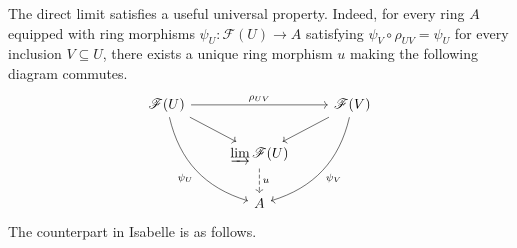 \documentclass[12pt]{scrartcl}
\begin{document}
The direct limit satisfies a useful universal property. Indeed, for every ring $A$ equipped with ring morphisms $\psi_U: \mathscr{F}(U) \rightarrow A$ satisfying $\psi_V \circ \rho_{UV} = \psi_U$ for every inclusion $V \subseteq U$, there exists a unique ring morphism $u$ making the following diagram commutes.
\[
\begin{tikzcd}
\mathscr{F}(U)  \arrow[rr, "\rho_{UV}"] \arrow[rd] \arrow[rdd, bend right, "\psi_U"'] & & \mathscr{F}(V) \arrow[ld]	\arrow[ldd, bend left, "\psi_V"]	\\
						& \varinjlim \mathscr{F}(U) \arrow[d, "u", dashed] &	\\
						& A &  
\end{tikzcd}
\] 
The counterpart in Isabelle is as follows.

\end{document}

